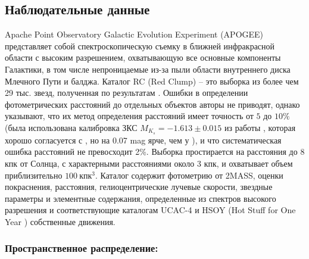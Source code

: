 \documentclass{matmex-diploma-custom}
\begin{document}
\subsection{Наблюдательные данные}
Apache Point Observatory Galactic Evolution Experiment (APOGEE) \cite{APOGEE} представляет собой спектроскопическую съемку в ближней инфракрасной области с высоким разрешением, охватывающую все основные компоненты Галактики, в том числе непроницаемые из-за пыли области внутреннего диска Млечного Пути и балджа. Каталог RC (Red Clump) \cite{DRdata, DRdecs} -- это выборка из более чем 29 тыс. звезд, полученная по результатам \cite{Bovy}. Ошибки в определении фотометрических расстояний до отдельных объектов авторы не приводят, однако указывают, что их метод определения расстояний имеет точность от $5$ до $10\%$ (была использована калибровка ЗКС $M_{K_s} = -1.613 \pm 0.015 $ из работы \cite{Laney}, которая хорошо согласуется с \cite{Alves}, но на 0.07 mag ярче, чем у \cite{Groenewegen}), и что систематическая ошибка расстояний не превосходит 2\%. Выборка простирается на расстояния до 8 кпк от Солнца, с характерными расстояниями около 3 кпк, и охватывает объем приблизительно $100 ~\textrm{кпк}^3$.  Каталог содержит фотометрию от 2MASS, оценки покраснения, расстояния, гелиоцентрические лучевые скорости, звездные параметры и элементные содержания, определенные из спектров высокого разрешения и соответствующие каталогам UCAC-4 \cite{UCAC4} и HSOY (Hot Stuff for One Year \cite{HSOY}) собственные движения. 

\subsubsection*{Пространственное распределение:}
\end{document}
